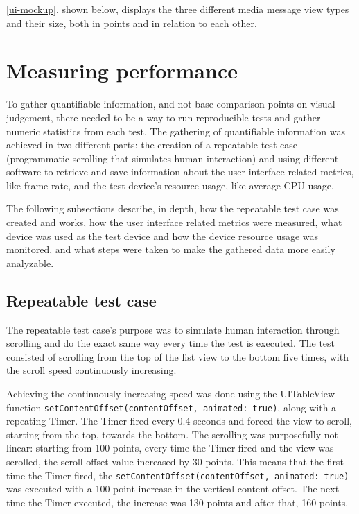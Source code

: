 \documentclass[a4paper,12pt]{article}
\begin{document}
\autoref{ui-mockup}, shown below, displays the three different media message view types and their size, both in points and in relation to each other.

\section{Measuring performance}
\label{sec:measuring-performance}
To gather quantifiable information, and not base comparison points on visual judgement, there needed to be a way to run reproducible tests and gather numeric statistics from each test. The gathering of quantifiable information was achieved in two different parts: the creation of a repeatable test case (programmatic scrolling that simulates human interaction) and using different software to retrieve and save information about the user interface related metrics, like frame rate, and the test device's resource usage, like average CPU usage.

The following subsections describe, in depth, how the repeatable test case was created and works, how the user interface related metrics were measured, what device was used as the test device and how the device resource usage was monitored, and what steps were taken to make the gathered data more easily analyzable. 

\subsection{Repeatable test case}
\label{subsec:repeatable-test-case}
The repeatable test case's purpose was to simulate human interaction through scrolling and do the exact same way every time the test is executed. The test consisted of scrolling from the top of the list view to the bottom five times, with the scroll speed continuously increasing.

Achieving the continuously increasing speed was done using the UITableView function \texttt{setContentOffset(contentOffset, animated: true)}, along with a repeating Timer. The Timer fired every 0.4 seconds and forced the view to scroll, starting from the top, towards the bottom. The scrolling was purposefully not linear: starting from 100 points, every time the Timer fired and the view was scrolled, the scroll offset value increased by 30 points. This means that the first time the Timer fired, the \texttt{setContentOffset(contentOffset, animated: true)} was executed with a 100 point increase in the vertical content offset. The next time the Timer executed, the increase was 130 points and after that, 160 points.
\end{document}
